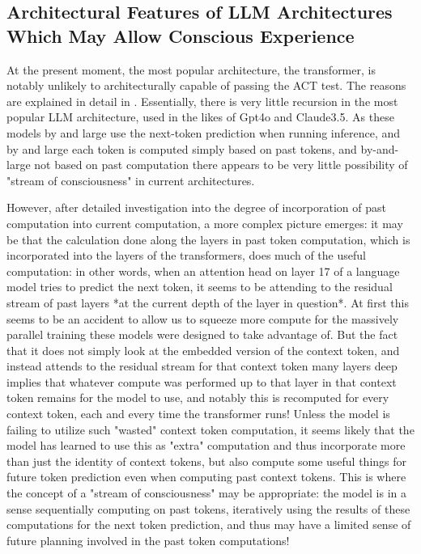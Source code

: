\documentclass{article}
\begin{document}
\subsection{Architectural Features of LLM Architectures Which May Allow Conscious Experience}

At the present moment, the most popular architecture, the transformer, is notably unlikely to architecturally capable of passing the ACT test. The reasons are explained in detail in \citep{butlin2023consciousnessartificialintelligenceinsights}. Essentially, there is very little recursion in the most popular LLM architecture, used in the likes of Gpt4o and Claude3.5. As these models by and large use the next-token prediction when running inference, and by and large each token is computed simply based on past tokens, and by-and-large not based on past computation there appears to be very little possibility of "stream of consciousness" in current architectures.

However, after detailed investigation into the degree of incorporation of past computation into current computation, a more complex picture emerges: it may be that the calculation done along the layers in past token computation, which is incorporated into the layers of the transformers, does much of the useful computation: in other words, when an attention head on layer 17 of a language model tries to predict the next token, it seems to be attending to the residual stream of past layers *at the current depth of the layer in question*. At first this seems to be an accident to allow us to squeeze more compute for the massively parallel training these models were designed to take advantage of. But the fact that it does not simply look at the embedded version of the context token, and instead attends to the residual stream for that context token many layers deep implies that whatever compute was performed up to that layer in that context token remains for the model to use, and notably this is recomputed for every context token, each and every time the transformer runs! Unless the model is failing to utilize such "wasted" context token computation, it seems likely that the model has learned to use this as "extra" computation and thus incorporate more than just the identity of context tokens, but also compute some useful things for future token prediction even when computing past context tokens. This is where the concept of a "stream of consciousness" may be appropriate: the model is in a sense sequentially computing on past tokens, iteratively using the results of these computations for the next token prediction, and thus may have a limited sense of future planning involved in the past token computations!
\end{document}
